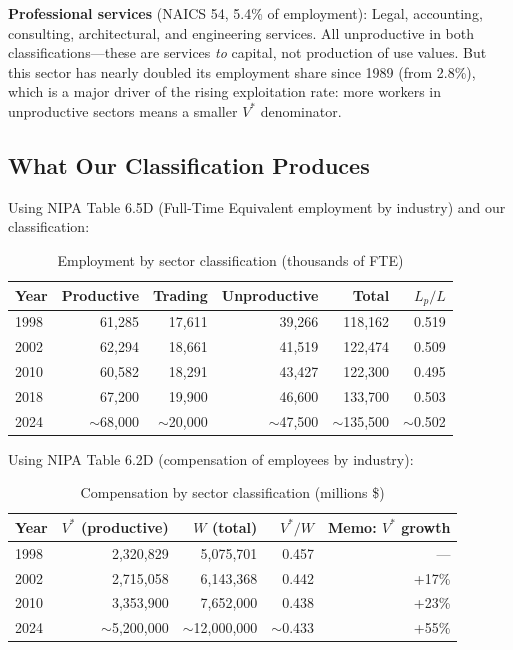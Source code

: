 \documentclass[12pt,a4paper]{article}
\begin{document}
\textbf{Professional services} (NAICS 54, 5.4\% of employment): Legal, accounting, consulting, architectural, and engineering services. All unproductive in both classifications---these are services \textit{to} capital, not production of use values. But this sector has nearly doubled its employment share since 1989 (from 2.8\%), which is a major driver of the rising exploitation rate: more workers in unproductive sectors means a smaller $V^*$ denominator.

\subsection{What Our Classification Produces}

Using NIPA Table 6.5D (Full-Time Equivalent employment by industry) and our classification:

\begin{table}[H]
\centering
\caption{Employment by sector classification (thousands of FTE)}
\begin{tabular}{lrrrrr}
\toprule
Year & Productive & Trading & Unproductive & Total & $L_p/L$ \\
\midrule
1998 & 61,285 & 17,611 & 39,266 & 118,162 & 0.519 \\
2002 & 62,294 & 18,661 & 41,519 & 122,474 & 0.509 \\
2010 & 60,582 & 18,291 & 43,427 & 122,300 & 0.495 \\
2018 & 67,200 & 19,900 & 46,600 & 133,700 & 0.503 \\
2024 & $\sim$68,000 & $\sim$20,000 & $\sim$47,500 & $\sim$135,500 & $\sim$0.502 \\
\bottomrule
\end{tabular}
\end{table}

Using NIPA Table 6.2D (compensation of employees by industry):

\begin{table}[H]
\centering
\caption{Compensation by sector classification (millions \$)}
\begin{tabular}{lrrrr}
\toprule
Year & $V^*$ (productive) & $W$ (total) & $V^*/W$ & Memo: $V^*$ growth \\
\midrule
1998 & 2,320,829 & 5,075,701 & 0.457 & --- \\
2002 & 2,715,058 & 6,143,368 & 0.442 & +17\% \\
2010 & 3,353,900 & 7,652,000 & 0.438 & +23\% \\
2024 & $\sim$5,200,000 & $\sim$12,000,000 & $\sim$0.433 & +55\% \\
\bottomrule
\end{tabular}
\end{table}
\end{document}
